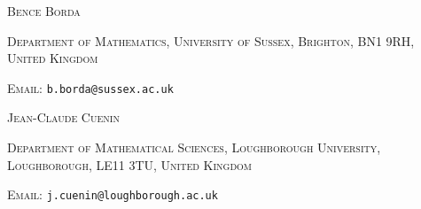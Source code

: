 \documentclass[11pt,a4paper]{article}
\theoremstyle{definition}
\begin{document}
\vspace{5mm}

\noindent\textsc{Bence Borda}

\noindent\textsc{Department of Mathematics, University of Sussex, Brighton, BN1 9RH, United Kingdom}

\noindent\textsc{Email:} \texttt{b.borda@sussex.ac.uk}

\vspace{5mm}

\noindent\textsc{Jean-Claude Cuenin}

\noindent\textsc{Department of Mathematical Sciences, Loughborough University, Loughborough, LE11 3TU, United Kingdom}

\noindent\textsc{Email:} \texttt{j.cuenin@loughborough.ac.uk}
\end{document}
